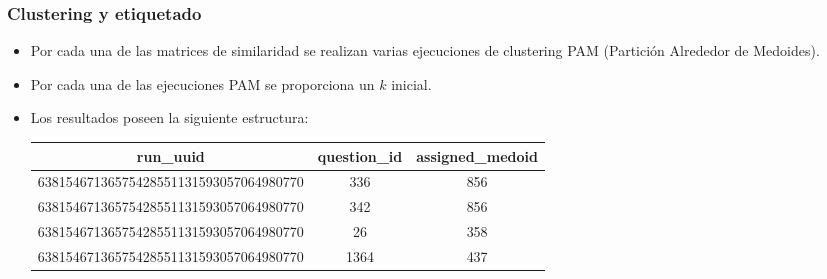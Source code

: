 \begin{frame}[fragile]
	\frametitle{Clustering y etiquetado}
	\begin{itemize}
		\item Por cada una de las matrices de similaridad se realizan varias ejecuciones de clustering PAM (Partición Alrededor de Medoides).
		\item Por cada una de las ejecuciones PAM se proporciona un \(k\) inicial.
		\item Los resultados poseen la siguiente estructura:
		\bigskip
			\begin{table}
				\scriptsize
				\begin{tabularx}{0.9\textwidth}{ccc}
					\toprule
					\textbf{run\_uuid}& \textbf{question\_id} & \textbf{assigned\_medoid} \\
					\midrule
					63815467136575428551131593057064980770 & 336 & 856 \\
					63815467136575428551131593057064980770 & 342& 856 \\
					63815467136575428551131593057064980770 & 26 & 358 \\
					63815467136575428551131593057064980770 & 1364 & 437 \\
					\bottomrule
				\end{tabularx}
				\label{tab:salida-clustering-1}
			\end{table}
	\end{itemize}
\end{frame}

